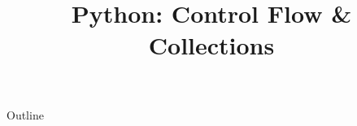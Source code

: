 \documentclass[xcolor=dvipsnames,compress,t,pdf]{beamer}
\title[\insertframenumber /\inserttotalframenumber]{Python: Control Flow \& Collections}
\begin{document}
	\begin{frame}
	\titlepage
	\end{frame}

	\begin{frame}{Outline}
	    \tableofcontents
	\end{frame}

	
	
	
\end{document}
